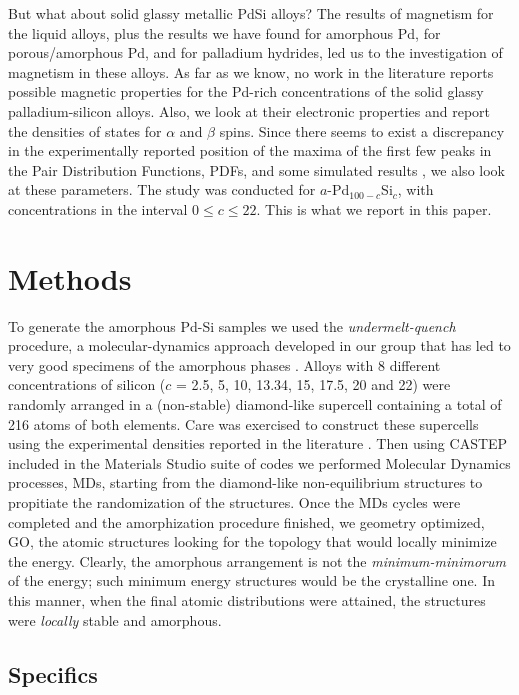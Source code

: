 \documentclass[fleqn,12pt]{wlscirep}
\begin{document}
But what about solid glassy metallic PdSi alloys? The results of magnetism for the liquid alloys, plus the results we have found for amorphous Pd, for porous/amorphous Pd, and for palladium hydrides, led us to the investigation of magnetism in these alloys. As far as we know, no work in the literature reports possible magnetic properties for the Pd-rich concentrations of the solid glassy palladium-silicon alloys. Also, we look at their electronic properties and report the densities of states for $\alpha$ and $\beta$ spins. Since there seems to exist a discrepancy in the experimentally reported position of the maxima of the first few peaks in the Pair Distribution Functions, PDFs, and some simulated results \cite{Fukunaga_1981, Wong_Guntherodt_book_1981}, we also look at these parameters. The study was conducted for $a$-Pd$_{100-c}$Si$_{c}$, with concentrations in the interval $0 \leq c \leq 22$. This is what we report in this paper.

\section*{Methods}

To generate the amorphous Pd-Si samples we used the \textit{undermelt-quench} procedure, a molecular-dynamics approach developed in our group that has led to very good specimens of the amorphous phases \cite{Rodriguez_2019, Valladares_2008}. Alloys with 8 different concentrations of silicon ($c$ = 2.5, 5, 10, 13.34, 15, 17.5, 20 and 22) were randomly arranged in a (non-stable) diamond-like supercell containing a total of 216 atoms of both elements. Care was exercised to construct these supercells using the experimental densities reported in the literature \cite{Okamoto_1993, Fukunaga_1981, Louzguine_Luzgin_2012}. Then using CASTEP \cite{Clark_2005} included in the Materials Studio suite of codes \cite{Biovia} we performed Molecular Dynamics processes, MDs, starting from the diamond-like non-equilibrium structures to propitiate the randomization of the structures. Once the MDs cycles were completed and the amorphization procedure finished, we geometry optimized, GO, the atomic structures looking for the topology that would locally minimize the energy. Clearly, the amorphous arrangement is not the \textit{minimum-minimorum} of the energy; such minimum energy structures would be the crystalline one. In this manner, when the final atomic distributions were attained, the structures were \textit{locally} stable and amorphous.

\subsection*{Specifics}
\end{document}
